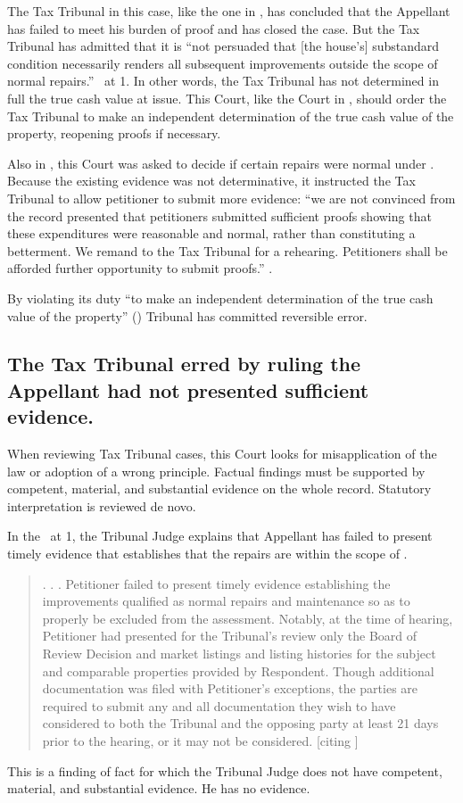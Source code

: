 \documentclass[12pt,\documentclassflag]{michiganCourtOfAppealsBrief}
\def\mathieuGast{\pincite[l]{MCL}{211.27(2)}}
\def\ttr287{\pincite[s]{TTR}{287}}
\begin{document}
{The Tax Tribunal in this case, like the one in \cite[s]{Jones & Laughlin}, has concluded that the Appellant has failed to meet his burden of proof and has closed the case.  But the Tax Tribunal has admitted that it is ``not persuaded that [the house's] substandard condition necessarily renders all subsequent improvements outside the scope of normal repairs.'' \FOJ\ at 1. In other words, the Tax Tribunal has not determined in full the true cash value at issue. This Court, like the Court in \cite[s]{Jones & Laughlin}, should order the Tax Tribunal to make an independent determination of the true cash value of the property, reopening proofs if necessary.

Also in \cite{Fisher}, this Court was asked to decide if certain repairs were normal under \mathieuGast. Because the existing evidence was not determinative, it instructed the Tax Tribunal to allow petitioner to submit more evidence: ``we are not convinced from the record presented that petitioners submitted sufficient proofs showing that these expenditures were reasonable and normal, rather than constituting a betterment. We remand to the Tax Tribunal for a rehearing. Petitioners shall be afforded further opportunity to submit proofs.'' .

By violating its duty ``to make an independent determination of the true cash value of the property'' () Tribunal has committed reversible error. 

\subsection{The Tax Tribunal erred by ruling the Appellant had not presented sufficient evidence.}
When reviewing Tax Tribunal cases, this Court looks for misapplication of the law or adoption of a wrong principle. Factual findings must be supported by competent, material, and substantial evidence on the whole record. Statutory interpretation is reviewed de novo. 

In the \FOJ\ at 1, the Tribunal Judge explains that Appellant has failed to present timely evidence that establishes that the repairs are within the scope of \mathieuGast. 


\begin{quote}  
. . .  Petitioner failed to present timely evidence establishing the improvements qualified as normal repairs and maintenance so as to properly be excluded from the assessment. Notably, at the time of hearing, Petitioner had presented for the Tribunal's review only the Board of Review Decision and market listings and listing histories for the subject and comparable properties provided by Respondent. Though additional documentation was filed with Petitioner's exceptions, the parties are required to submit any and all documentation they wish to have considered to both the Tribunal and the opposing party at least 21 days prior to the hearing, or it may not be considered. [citing \ttr287]
\end{quote}
 This is a finding of fact for which the Tribunal Judge does not have competent, material, and substantial evidence. He has no evidence.

}
\end{document}
